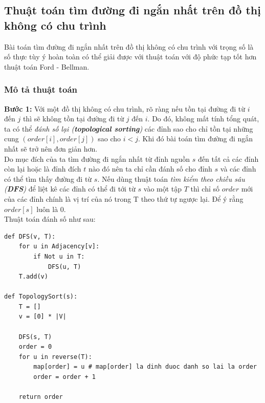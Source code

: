 \documentclass[a4paper,12pt]{report}
\begin{document}

\subsection{Thuật toán tìm đường đi ngắn nhất trên đồ thị không có chu trình}
	Bài toán tìm đường đi ngắn nhất trên đồ thị không có chu trình với
        trọng số là số thực tùy ý hoàn toàn có thể giải được với thuật toán 
        với độ phức tạp tốt hơn thuật toán Ford - Bellman.\\

        \subsubsection{Mô tả thuật toán}
        \textbf{Bước 1:} Với một đồ thị không có chu trình, rõ ràng nếu tồn tại đường đi từ $i$
        đến $j$ thì sẽ không tồn tại đường đi từ $j$ đến $i$. Do đó, không mất
        tính tổng quát, ta có thể \textit{đánh số lại (\textbf{topological
        sorting})}
        các đỉnh sao cho chỉ tồn tại những cung $(order[i], order[j])$ sao cho $i < j$. Khi
        đó bài toán tìm đường đi ngắn nhất sẽ trở nên đơn giản hơn.\\

        Do mục đích của ta tìm đường đi ngắn nhất từ đỉnh nguồn $s$ đến tất cả
        các đỉnh còn lại hoặc là đỉnh đích $t$ nào đó nên ta chỉ cần đánh số
        cho đỉnh $s$ và các đỉnh có thể tìm thấy đường đi từ $s$. Nếu dùng
        thuật toán \textit{tìm kiểm theo chiều sâu (\textbf{DFS})} để liệt kê
        các đỉnh có thể đi tới từ $s$ vào một tập $T$ thì chỉ số $order$ mới của
        các đỉnh chính là vị trí của nó trong T theo thứ tự ngược lại. Để ý
        rằng $order[s]$ luôn là $0$.\\

        Thuật toán đánh số như sau:\\

        \begin{verbatim}
def DFS(v, T):
    for u in Adjacency[v]:
        if Not u in T:
            DFS(u, T)
    T.add(v)

def TopologySort(s):
    T = []
    v = [0] * |V|

    DFS(s, T)
    order = 0
    for u in reverse(T):
        map[order] = u # map[order] la dinh duoc danh so lai la order
        order = order + 1

    return order
        \end{verbatim}
\end{document}
